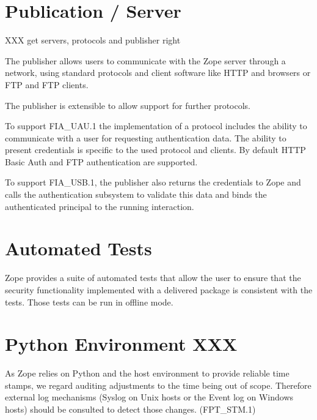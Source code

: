 \documentclass[10pt,a4paper,english]{scrbook}
\begin{document}
\section{Publication / Server}

XXX get servers, protocols and publisher right

The publisher allows users to communicate with the Zope server through a
network, using standard protocols and client software like HTTP and browsers or
FTP and FTP clients.

The publisher is extensible to allow support for further protocols.

To support FIA{\_}UAU.1 the implementation of a protocol includes the ability to
communicate with a user for requesting authentication data. The ability to
present credentials is specific to the used protocol and clients. By default
HTTP Basic Auth and FTP authentication are supported.

To support FIA{\_}USB.1, the publisher also returns the credentials to Zope and
calls the authentication subsystem to validate this data and binds the
authenticated principal to the running interaction.



\hypertarget{automated-tests}{}
\section{Automated Tests}

Zope provides a suite of automated tests that allow the user to ensure that the
security functionality implemented with a delivered package is consistent with
the tests. Those tests can be run in offline mode.



\hypertarget{python-environment-xxx}{}
\section{Python Environment XXX}

As Zope relies on Python and the host environment to provide reliable time
stamps, we regard auditing adjustments to the time being out of scope.
Therefore external log mechanisms (Syslog on Unix hosts or the Event log on
Windows hosts) should be consulted to detect those changes. (FPT{\_}STM.1)
\end{document}
